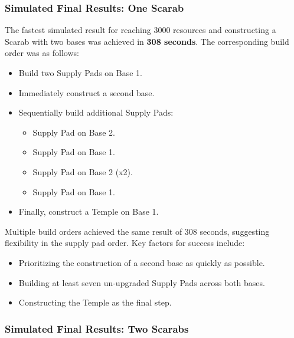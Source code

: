 \documentclass[a4paper, 12pt, english]{article}
\begin{document}
\subsubsection{Simulated Final Results: One Scarab}

The fastest simulated result for reaching 3000 resources and constructing a Scarab with two bases was achieved in \textbf{308 seconds}. The corresponding build order was as follows:  
\begin{itemize}
    \item Build two Supply Pads on Base 1.
    \item Immediately construct a second base.
    \item Sequentially build additional Supply Pads:
    \begin{itemize}
        \item Supply Pad on Base 2.
        \item Supply Pad on Base 1.
        \item Supply Pad on Base 2 (x2).
        \item Supply Pad on Base 1.
    \end{itemize}
    \item Finally, construct a Temple on Base 1.
\end{itemize}


Multiple build orders achieved the same result of 308 seconds, suggesting flexibility in the supply pad order. Key factors for success include:
\begin{itemize}
    \item Prioritizing the construction of a second base as quickly as possible.
    \item Building at least seven un-upgraded Supply Pads across both bases.
    \item Constructing the Temple as the final step.
\end{itemize}

\subsubsection{Simulated Final Results: Two Scarabs}
\end{document}
